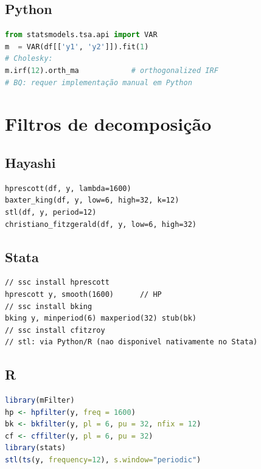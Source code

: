 \subsection*{Python}

\begin{lstlisting}[language=Python, basicstyle=\ttfamily\small,
  frame=single, numbers=none, backgroundcolor=\color{codbg},
  keywordstyle=\color{keyword}\bfseries,
  stringstyle=\color{string},
  commentstyle=\color{comment}\itshape]
from statsmodels.tsa.api import VAR
m  = VAR(df[['y1', 'y2']]).fit(1)
# Cholesky:
m.irf(12).orth_ma            # orthogonalized IRF
# BQ: requer implementação manual em Python
\end{lstlisting}

\section{Filtros de decomposição}

\subsection*{Hayashi}

\begin{lstlisting}
hprescott(df, y, lambda=1600)
baxter_king(df, y, low=6, high=32, k=12)
stl(df, y, period=12)
christiano_fitzgerald(df, y, low=6, high=32)
\end{lstlisting}

\subsection*{Stata}

\begin{lstlisting}[language={}, basicstyle=\ttfamily\small,
  frame=single, numbers=none, backgroundcolor=\color{codbg}]
// ssc install hprescott
hprescott y, smooth(1600)      // HP
// ssc install bking
bking y, minperiod(6) maxperiod(32) stub(bk)
// ssc install cfitzroy
// stl: via Python/R (nao disponivel nativamente no Stata)
\end{lstlisting}

\subsection*{R}

\begin{lstlisting}[language=R, basicstyle=\ttfamily\small,
  frame=single, numbers=none, backgroundcolor=\color{codbg},
  keywordstyle=\color{keyword}\bfseries,
  stringstyle=\color{string},
  commentstyle=\color{comment}\itshape]
library(mFilter)
hp <- hpfilter(y, freq = 1600)
bk <- bkfilter(y, pl = 6, pu = 32, nfix = 12)
cf <- cffilter(y, pl = 6, pu = 32)
library(stats)
stl(ts(y, frequency=12), s.window="periodic")
\end{lstlisting}

